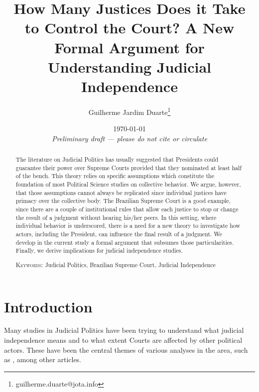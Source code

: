 \documentclass[12pt, a4paper]{article}
\title{\textbf{How Many Justices Does it Take to Control the Court?} A New Formal Argument for Understanding Judicial Independence}
\author{Guilherme Jardim Duarte\thanks{guilherme.duarte@jota.info}}
\date{\vspace{.5cm} \today \\ 
\vspace{.5cm} \textit{Preliminary draft --- please do not cite or circulate}}
\begin{document}
\doublespacing
\maketitle

\begin{abstract}


The literature on Judicial Politics has usually suggested that Presidents could guarantee their power over Supreme Courts provided that they nominated at least half of the bench. This theory relies on specific assumptions which
constitute the foundation of most Political Science studies on collective behavior. We argue, however, that those assumptions cannot always be replicated since individual justices have primacy over the collective body. The Brazilian Supreme Court is a good example, since there are a couple of institutional rules that allow
each justice to stop or change the result of a judgment without hearing his/her peers. In this setting, where individual behavior is underscored, there is a need for
a new theory to investigate how actors, including the President, can
influence the final result of a judgment. We develop in the current study a formal argument that subsumes those particularities. Finally, we derive implications for judicial independence studies. 


\vspace{.5cm}
\noindent
\textsc{Keywords}: Judicial Politics, Brazilian Supreme Court, Judicial Independence
\end{abstract}

\newpage

\section{Introduction}
  

Many studies in Judicial Politics have been trying to understand what judicial independence means and to what extent Courts are affected by other political actors. These have been the central themes 
of various analyses in the area, such as \citet{ferejohn1998independent,hanssen2004there,helmke2009regimes,helmke2014inducing,ginsburg2014does}, among other  articles. 
\end{document}

